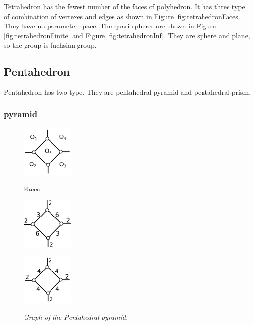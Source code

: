 \documentclass[dvipdfmx]{interact}
\theoremstyle{plain}%
\theoremstyle{definition}
\theoremstyle{remark}
\theoremstyle{problemstyle}
\begin{document}
Tetrahedron has the fewest number of the faces of polyhedron.
It has three type of combination of vertexes and edges as shown in
Figure \ref{fig:tetrahedronFaces}.
They have no parameter space.
The quasi-spheres are shown in Figure \ref{fig:tetrahedronFinite}
and Figure \ref{fig:tetrahedronInf}.
They are sphere and plane, so the group is fuchsian group.

\subsection{Pentahedron}

Pentahedron has two type. They are pentahedral pyramid and pentahedral prism.

\subsubsection{pyramid}

\begin{figure}[h!tbp]
  \begin{minipage}[t]{0.3\textwidth}
   \centering
   \includegraphics[width=1in, keepaspectratio]{./img/HexahedraWithSphericalFaces/pentahedralPyramid/pentahedralPyramidFaces.png}
   \caption{Faces}
   \label{fig:}
  \end{minipage}
 \hspace*{\fill}
  \begin{minipage}[t]{0.6\textwidth}
  \begin{minipage}[t]{0.3\textwidth}
   \centering
   \includegraphics[width=1in,
   keepaspectratio]{./img/HexahedraWithSphericalFaces/pentahedralPyramid/pentahedralPyramid_a.png}
   \subcaption{}
   \label{fig:}
  \end{minipage}
  \hspace*{\fill}
  \begin{minipage}[t]{0.3\textwidth}
   \centering
   \includegraphics[width=1in, keepaspectratio]{./img/HexahedraWithSphericalFaces/pentahedralPyramid/pentahedralPyramid_b.png}
   \subcaption{}
   \label{}
  \end{minipage}
 \hspace*{\fill}
  \caption{\textit{Graph of the Pentahedral pyramid.}}
  \label{fig:}
  \end{minipage}
\end{figure}
\end{document}
